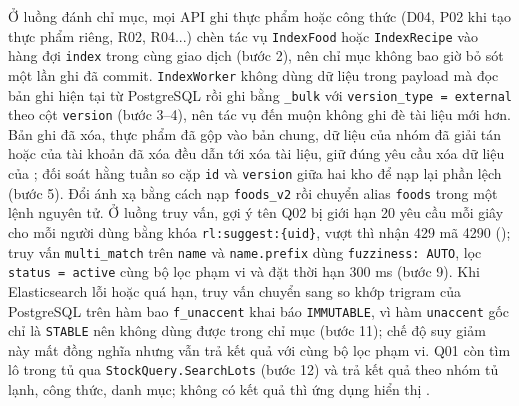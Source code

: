 Ở luồng đánh chỉ mục, mọi API ghi thực phẩm hoặc công thức (D04, P02 khi tạo thực phẩm riêng, R02, R04...) chèn tác vụ \texttt{IndexFood} hoặc \texttt{IndexRecipe} vào hàng đợi \texttt{index} trong cùng giao dịch (bước 2), nên chỉ mục không bao giờ bỏ sót một lần ghi đã commit. \texttt{IndexWorker} không dùng dữ liệu trong payload mà đọc bản ghi hiện tại từ PostgreSQL rồi ghi bằng \texttt{\_bulk} với \texttt{version\_type = external} theo cột \texttt{version} (bước 3--4), nên tác vụ đến muộn không ghi đè tài liệu mới hơn. Bản ghi đã xóa, thực phẩm đã gộp vào bản chung, dữ liệu của nhóm đã giải tán hoặc của tài khoản đã xóa đều dẫn tới xóa tài liệu, giữ đúng yêu cầu xóa dữ liệu của ; đối soát hằng tuần so cặp \texttt{id} và \texttt{version} giữa hai kho để nạp lại phần lệch (bước 5). Đổi ánh xạ bằng cách nạp \texttt{foods\_v2} rồi chuyển alias \texttt{foods} trong một lệnh nguyên tử. Ở luồng truy vấn, gợi ý tên Q02 bị giới hạn 20 yêu cầu mỗi giây cho mỗi người dùng bằng khóa \texttt{rl:suggest:\{uid\}}, vượt thì nhận 429 mã 4290 (); truy vấn \texttt{multi\_match} trên \texttt{name} và \texttt{name.prefix} dùng \texttt{fuzziness: AUTO}, lọc \texttt{status = active} cùng bộ lọc phạm vi và đặt thời hạn 300 ms (bước 9). Khi Elasticsearch lỗi hoặc quá hạn, truy vấn chuyển sang so khớp trigram của PostgreSQL trên hàm bao \texttt{f\_unaccent} khai báo \texttt{IMMUTABLE}, vì hàm \texttt{unaccent} gốc chỉ là \texttt{STABLE} nên không dùng được trong chỉ mục (bước 11); chế độ suy giảm này mất đồng nghĩa nhưng vẫn trả kết quả với cùng bộ lọc phạm vi. Q01 còn tìm lô trong tủ qua \texttt{StockQuery.SearchLots} (bước 12) và trả kết quả theo nhóm tủ lạnh, công thức, danh mục; không có kết quả thì ứng dụng hiển thị .


